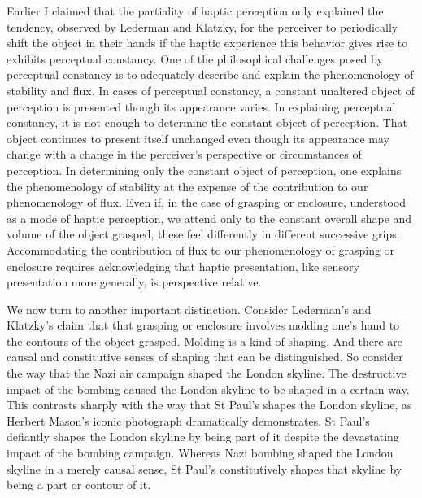 \documentclass[12pt]{article}
\begin{document}
Earlier I claimed that the partiality of haptic perception only explained the tendency, observed by Lederman and Klatzky, for the perceiver to periodically shift the object in their hands if the haptic experience this behavior gives rise to exhibits perceptual constancy. One of the philosophical challenges posed by perceptual constancy is to adequately describe and explain the phenomenology of stability and flux. In cases of perceptual constancy, a constant unaltered object of perception is presented though its appearance varies. In explaining perceptual constancy, it is not enough to determine the constant object of perception. That object continues to present itself unchanged even though its appearance may change with a change in the perceiver's perspective or circumstances of perception. In determining only the constant object of perception, one explains the phenomenology of stability at the expense of the contribution to our phenomenology of flux. Even if, in the case of grasping or enclosure, understood as a mode of haptic perception, we attend only to the constant overall shape and volume of the object grasped, these feel differently in different successive grips. Accommodating the contribution of flux to our phenomenology of grasping or enclosure requires acknowledging that haptic presentation, like sensory presentation more generally, is perspective relative.

We now turn to another important distinction. Consider Lederman's and Klatzky's claim that that grasping or enclosure involves molding one's hand to the contours of the object grasped. Molding is a kind of shaping. And there are causal and constitutive senses of shaping that can be distinguished. So consider the way that the Nazi air campaign shaped the London skyline. The destructive impact of the bombing caused the London skyline to be shaped in a certain way. This contrasts sharply with the way that St Paul's shapes the London skyline, as Herbert Mason's iconic photograph dramatically demonstrates. St Paul's defiantly shapes the London skyline by being part of it despite the devastating impact of the bombing campaign. Whereas Nazi bombing shaped the London skyline in a merely causal sense, St Paul's constitutively shapes that skyline by being a part or contour of it.
\end{document}
